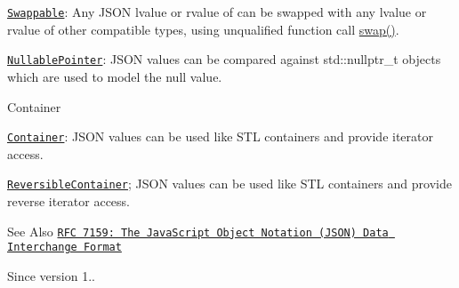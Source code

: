 \begin{DoxyItemize}
\begin{DoxyItemize}
\item \href{http://en.cppreference.com/w/cpp/concept/Swappable}{\tt Swappable}\-: Any J\-S\-O\-N lvalue or rvalue of can be swapped with any lvalue or rvalue of other compatible types, using unqualified function call \hyperlink{classnlohmann_1_1basic__json_aafda4fe80657173ac8efa8f862144840}{swap()}.
\item \href{http://en.cppreference.com/w/cpp/concept/NullablePointer}{\tt Nullable\-Pointer}\-: J\-S\-O\-N values can be compared against {\ttfamily std\-::nullptr\-\_\-t} objects which are used to model the {\ttfamily null} value.
\end{DoxyItemize}
\item Container
\begin{DoxyItemize}
\item \href{http://en.cppreference.com/w/cpp/concept/Container}{\tt Container}\-: J\-S\-O\-N values can be used like S\-T\-L containers and provide iterator access.
\item \href{http://en.cppreference.com/w/cpp/concept/ReversibleContainer}{\tt Reversible\-Container}; J\-S\-O\-N values can be used like S\-T\-L containers and provide reverse iterator access.
\end{DoxyItemize}
\end{DoxyItemize}

\begin{DoxySeeAlso}{See Also}
\href{http://rfc7159.net/rfc7159}{\tt R\-F\-C 7159\-: The Java\-Script Object Notation (J\-S\-O\-N) Data Interchange Format}
\end{DoxySeeAlso}
\begin{DoxySince}{Since}
version 1.. 
\end{DoxySince}


